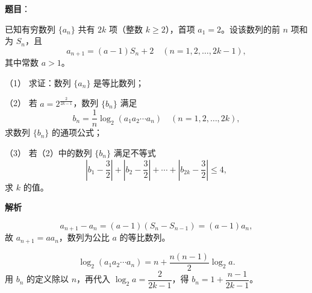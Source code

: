 \begin{answer}

\textbf{题目}：

已知有穷数列 $\{a_n\}$ 共有 $2k$ 项（整数 $k\ge2$），首项 $a_1=2$。设该数列的前 $n$ 项和为 $S_n$，且
\nopagebreak[4]
\[
a_{n+1}=(a-1)S_n+2\quad(n=1,2,\ldots,2k-1),
\]
其中常数 $a>1$。

（1） 求证：数列 $\{a_n\}$ 是等比数列；

（2） 若 $a=2^{\frac{2}{2k-1}}$，数列 $\{b_n\}$ 满足
\nopagebreak[4]
\[
b_n=\frac1n\log_2(a_1a_2\cdots a_n)\quad(n=1,2,\ldots,2k),
\]
求数列 $\{b_n\}$ 的通项公式；

（3） 若（2）中的数列 $\{b_n\}$ 满足不等式
\nopagebreak[4]
\[
\left|b_1-\frac32\right|+\left|b_2-\frac32\right|+\cdots+
\left|b_{2k}-\frac32\right|\le4,
\]
求 $k$ 的值。

\textbf{解析}

\nopagebreak[4]
\[
a_{n+1}-a_n=(a-1)(S_n-S_{n-1})=(a-1)a_n,
\]
故 $a_{n+1}=aa_n$，数列为公比 $a$ 的等比数列。

\nopagebreak[4]
\[
\log_2(a_1a_2\cdots a_n)=n+\frac{n(n-1)}2\log_2a.
\]
用 $b_n$ 的定义除以 $n$，再代入 $\log_2a=\dfrac2{2k-1}$，得 $b_n=1+\dfrac{n-1}{2k-1}$。





\end{answer}
